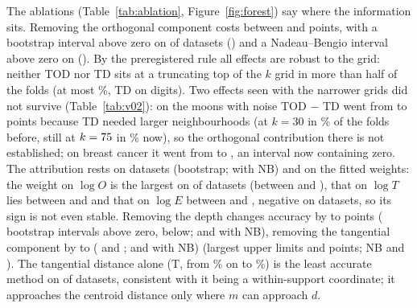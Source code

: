 \documentclass[10pt,a4paper]{article}
\theoremstyle{plain}
\theoremstyle{definition}
\theoremstyle{remark}
\newcommand{\meth}[1]{\textsf{#1}}
\begin{document}
The ablations (Table~\ref{tab:ablation}, Figure~\ref{fig:forest}) say where the information sits. Removing the orthogonal component costs between \AblOrthMin{} and \AblOrthMax{} points, with a bootstrap interval above zero on \NAblOrthCiAboveZero{} of \NDatasets{} datasets (\OrthRobustList) and a Nadeau--Bengio interval above zero on \NAblOrthNbAboveZero{} (\AblOrthNbAboveList). By the preregistered rule all \NOrthRobust{} effects are robust to the grid: neither \meth{TOD} nor \meth{TD} sits at a truncating top of the $k$ grid in more than half of the folds (at most \FracKMaxDigitsTd\%, \meth{TD} on digits). Two effects seen with the narrower grids did not survive (Table~\ref{tab:v02}): on the moons with noise \meth{TOD} $-$ \meth{TD} went from \VtwoAblTdMoonsN{} to \AblMoonsNTd{} points because \meth{TD} needed larger neighbourhoods (at $k=30$ in \VtwoFracTdMoonsN\% of the folds before, still at $k=75$ in \FracKMaxMoonsNTd\% now), so the orthogonal contribution there is not established; on breast cancer it went from \VtwoAblTdBc{} to \AblBcTd, an interval now containing zero. The attribution rests on \NOrthRobust{} datasets (bootstrap; \NOrthRobustNb{} with NB) and on the fitted weights: the weight on $\log O$ is the largest on \NWOLargest{} of \NDatasets{} datasets (between \WOMin{} and \WOMax), that on $\log T$ lies between \WTMin{} and \WTMax{} and that on $\log E$ between \WDMin{} and \WDMax, negative on \NWDNegative{} datasets, so its sign is not even stable. Removing the depth changes accuracy by \AblDepthMin{} to \AblDepthMax{} points (\NAblDepthCiAboveZero{} bootstrap intervals above zero, \NAblDepthCiBelowZero{} below; \NAblDepthNbAboveZero{} and \NAblDepthNbBelowZero{} with NB), removing the tangential component by \AblTangMin{} to \AblTangMax{} (\NAblTangCiAboveZero{} and \NAblTangCiBelowZero; \NAblTangNbAboveZero{} and \NAblTangNbBelowZero{} with NB) (largest upper limits \AblDepthCiHiMax{} and \AblTangCiHiMax{} points; NB \AblDepthNbHiMax{} and \AblTangNbHiMax). The tangential distance alone (\meth{T}, from \AccTMin\% on \AccTArgMin{} to \AccTMax\%) is the least accurate method on \NTWorst{} of \NDatasets{} datasets, consistent with it being a within-support coordinate; it approaches the centroid distance only where $m$ can approach $d$.
\end{document}
